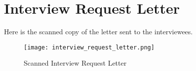%
%
%                 
\chapter{Interview Request Letter}
\label{sec:appendixc}
Here is the scanned copy of the letter sent to the interviewees.
\begin{figure}[h!]
  \centering
  \texttt{[image: interview\_request\_letter.png]}
  \caption{Scanned Interview Request Letter}
  \label{fig:interview_letter}
\end{figure}
